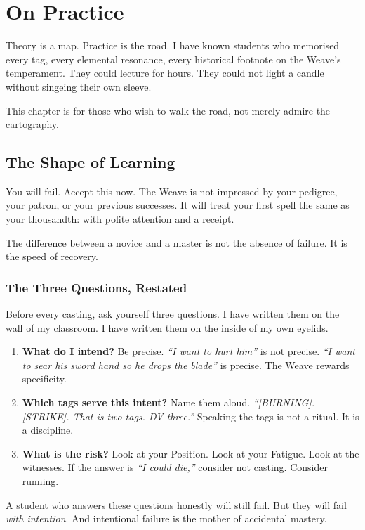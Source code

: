 \chapter{On Practice}

Theory is a map. Practice is the road. I have known students who memorised every tag, every elemental resonance, every historical footnote on the Weave's temperament. They could lecture for hours. They could not light a candle without singeing their own sleeve.

This chapter is for those who wish to walk the road, not merely admire the cartography.

\section{The Shape of Learning}

You will fail. Accept this now. The Weave is not impressed by your pedigree, your patron, or your previous successes. It will treat your first spell the same as your thousandth: with polite attention and a receipt.

The difference between a novice and a master is not the absence of failure. It is the speed of recovery.

\subsection{The Three Questions, Restated}

Before every casting, ask yourself three questions. I have written them on the wall of my classroom. I have written them on the inside of my own eyelids.

\begin{enumerate}
    \item \textbf{What do I intend?} Be precise. \emph{``I want to hurt him''} is not precise. \emph{``I want to sear his sword hand so he drops the blade''} is precise. The Weave rewards specificity.
    \item \textbf{Which tags serve this intent?} Name them aloud. \emph{``[BURNING]. [STRIKE]. That is two tags. DV three.''} Speaking the tags is not a ritual. It is a discipline.
    \item \textbf{What is the risk?} Look at your Position. Look at your Fatigue. Look at the witnesses. If the answer is \emph{``I could die,''} consider not casting. Consider running.
\end{enumerate}

A student who answers these questions honestly will still fail. But they will fail \emph{with intention}. And intentional failure is the mother of accidental mastery.

